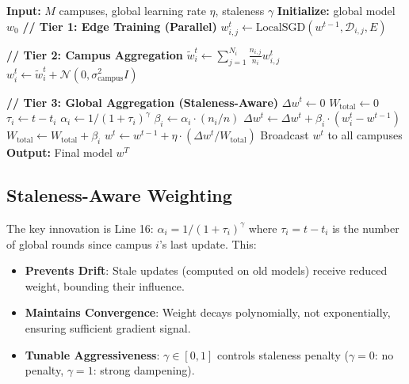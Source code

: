 \documentclass[conference]{IEEEtran}
\begin{document}
\begin{algorithm}[H]
\caption{Hierarchical FedAvg (H-FedAvg)}
\begin{algorithmic}[1]
\STATE \textbf{Input:} $M$ campuses, global learning rate $\eta$, staleness $\gamma$
\STATE \textbf{Initialize:} global model $w_0$
    \STATE \textbf{// Tier 1: Edge Training (Parallel)}
            \STATE $w_{i,j}^{t} \leftarrow \text{LocalSGD}(w^{t-1}, \mathcal{D}_{i,j}, E)$ 
        \ENDFOR
    \ENDFOR
    
    \STATE \textbf{// Tier 2: Campus Aggregation}
        \STATE $\tilde{w}_i^t \leftarrow \sum_{j=1}^{N_i} \frac{n_{i,j}}{n_i} w_{i,j}^t$ 
        \STATE $w_i^t \leftarrow \tilde{w}_i^t + \mathcal{N}(0, \sigma_{\text{campus}}^2 I)$ 
    \ENDFOR
    
    \STATE \textbf{// Tier 3: Global Aggregation (Staleness-Aware)}
    \STATE $\Delta w^t \leftarrow 0$
    \STATE $W_{\text{total}} \leftarrow 0$
        \STATE $\tau_i \leftarrow t - t_i$ 
        \STATE $\alpha_i \leftarrow 1 / (1 + \tau_i)^\gamma$ 
        \STATE $\beta_i \leftarrow \alpha_i \cdot (n_i / n)$ 
        \STATE $\Delta w^t \leftarrow \Delta w^t + \beta_i \cdot (w_i^t - w^{t-1})$
        \STATE $W_{\text{total}} \leftarrow W_{\text{total}} + \beta_i$
    \ENDFOR
    \STATE $w^t \leftarrow w^{t-1} + \eta \cdot (\Delta w^t / W_{\text{total}})$
    \STATE Broadcast $w^t$ to all campuses
\ENDFOR
\STATE \textbf{Output:} Final model $w^T$
\end{algorithmic}
\end{algorithm}

\subsection{Staleness-Aware Weighting}

The key innovation is Line 16: $\alpha_i = 1/(1+\tau_i)^\gamma$ where $\tau_i = t - t_i$ is the number of global rounds since campus $i$'s last update. This:

\begin{itemize}
    \item \textbf{Prevents Drift}: Stale updates (computed on old models) receive reduced weight, bounding their influence.
    \item \textbf{Maintains Convergence}: Weight decays polynomially, not exponentially, ensuring sufficient gradient signal.
    \item \textbf{Tunable Aggressiveness}: $\gamma \in [0, 1]$ controls staleness penalty ($\gamma=0$: no penalty, $\gamma=1$: strong dampening).
\end{itemize}
\end{document}
